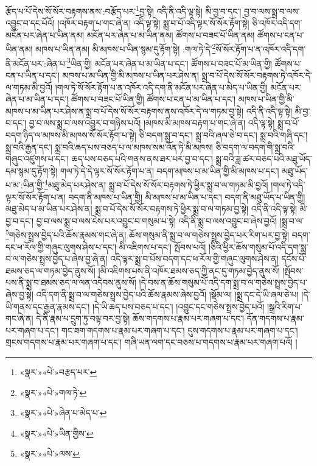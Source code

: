 རྩོད་པ་པོ་དེས་སོ་སོར་བརྟགས་ནས་:བརྩོད་པར་\footnote{«སྣར་»«པེ་»བརྩད་པར་}བྱ་སྟེ། འདི་ནི་འདི་ལྟ་སྟེ། མི་བྱ་བ་དང་། བྱ་བ་ལས་སྨྲ་བ་ལས་འབྱུང་བ་དང་པོའོ། །འཁོར་བརྟག་པ་གང་ཞེ་ན། འདི་ལྟ་སྟེ། སྨྲ་བ་པོ་འདི་ལྟར་སོ་སོར་རྟོག་སྟེ། ཅི་འཁོར་འདི་དག་མངོན་པར་ཞེན་པ་ཡིན་ནམ། མངོན་པར་ཞེན་པ་མ་ཡིན་ནམ། ཚོགས་པ་བཟང་པོ་ཡིན་ནམ། ཚོགས་པ་ངན་པ་ཡིན་ནམ། མཁས་པ་ཡིན་ནམ། མི་མཁས་པ་ཡིན་སྙམ་དུ་རྟོག་སྟེ། :གལ་ཏེ་དེ་\footnote{«སྣར་»«པེ་»གལ་ཏེ་}སོ་སོར་རྟོག་པ་ན་འཁོར་འདི་དག་ནི་མངོན་པར་:ཞེན་པ་\footnote{«སྣར་»«པེ་»ཞེན་པ་མེད་པ་}ཡིན་གྱི། མངོན་པར་ཞེན་པ་མ་ཡིན་པ་དང་། ཚོགས་པ་བཟང་པོ་མ་ཡིན་གྱི། ཚོགས་པ་ངན་པ་ཡིན་པ་དང་། མཁས་པ་མ་ཡིན་གྱི་མི་མཁས་པ་ཡིན་པར་ཤེས་ན། སྨྲ་བ་པོ་དེས་སོ་སོར་བརྟགས་ཏེ་འཁོར་དེ་ལ་གཏམ་མི་བྱའོ། །གལ་ཏེ་སོ་སོར་རྟོག་པ་ན་འཁོར་འདི་དག་ནི་མངོན་པར་ཞེན་པ་མེད་པ་ཡིན་གྱི། མངོན་པར་ཞེན་པ་མ་ཡིན་པ་དང་། ཚོགས་པ་བཟང་པོ་ཡིན་གྱི། ཚོགས་པ་ངན་པ་མ་ཡིན་པ་དང་། མཁས་པ་ཡིན་གྱི་མི་མཁས་པ་མ་ཡིན་པར་ཤེས་ན་སྨྲ་བ་པོ་དེས་སོ་སོར་བརྟགས་ནས་འཁོར་དེ་ལ་གཏམ་བྱ་སྟེ། འདི་ནི་འདི་ལྟ་སྟེ། མི་བྱ་བ་དང་། བྱ་བ་ལས་སྨྲ་བ་ལས་འབྱུར་བ་གཉིས་པའོ། །མཁས་མི་མཁས་བརྟག་པ་གང་ཞེ་ན། འདི་ལྟ་སྟེ། སྨྲ་བ་པོ་བདག་ཉིད་ལ་མཁས་མི་མཁས་སོ་སོར་རྟོག་པ་སྟེ། ཅི་བདག་སྨྲ་བ་དང་། སྨྲ་བའི་ཞལ་ཅེ་བ་དང་། སྨྲ་བའི་གཞི་དང་། སྨྲ་བའི་རྒྱན་དང་། སྨྲ་བའི་ཆད་པས་བཅད་པ་ལ་མཁས་སམ་འོན་ཏེ་མི་མཁས། ཅི་བདག་ལ་བདག་གི་སྨྲ་བའི་གཞུང་འཛུགས་པ་དང་། ཆད་པས་བཅད་པའི་གནས་ནས་ཐར་པར་བྱ་བ་དང་། སྨྲ་བའི་ཟླ་ཚར་བཅད་པའི་མཐུ་ཡོད་དམ་སྙམ་དུ་རྟོག་སྟེ། གལ་ཏེ་དེ་དེ་ལྟར་སོ་སོར་རྟོག་པ་ན། བདག་མཁས་པ་མ་ཡིན་གྱི་མི་མཁས་པ་དང་། མཐུ་ཡོད་པ་མ་:ཡིན་གྱི་\footnote{«སྣར་»«པེ་»ཡིན་གྱིས་}མཐུ་མེད་པར་ཤེས་ན། སྨྲ་བ་པོ་དེས་སོ་སོར་བརྟགས་ཏེ་ཕྱིར་སྨྲ་བ་ལ་གཏམ་མི་བྱའོ། །གལ་ཏེ་འདི་ལྟར་སོ་སོར་རྟོག་པ་ན། བདག་ནི་མཁས་པ་ཡིན་གྱི། མི་མཁས་པ་མ་ཡིན་པ་དང་། བདག་ནི་མཐུ་ཡོད་པ་ཡིན་གྱི། མཐུ་མེད་པ་མ་ཡིན་པར་ཤེས་ན། སྨྲ་བ་པོ་དེས་སོ་སོར་བརྟགས་ཏེ་ཕྱིར་སྨྲ་བ་ལ་གཏམ་བྱ་སྟེ། འདི་ནི་འདི་ལྟ་སྟེ། མི་བྱ་བ་དང་། བྱ་བ་ལས་སྨྲ་བ་ལས་ངེས་པར་འབྱུང་བ་གསུམ་པ་སྟེ། འདི་ནི་སྨྲ་བ་ལས་འབྱུང་བ་ཞེས་བྱའོ། །སྨྲ་བ་ལ་\footnote{«སྣར་»«པེ་»ལས་}གཅེས་སྤྲས་བྱེད་པའི་ཆོས་རྣམས་གང་ཞེ་ན། ཆོས་གསུམ་ནི་སྨྲ་བ་ལ་གཅེས་སྤྲས་བྱེད་པར་རིག་པར་བྱ་སྟེ། བདག་དང་ཕ་རོལ་གྱི་གཞུང་ལུགས་ཤེས་པ་དང་། མི་འཇིགས་པ་དང་། སྤོབས་པའོ། །ཅིའི་ཕྱིར་ཆོས་གསུམ་པོ་འདི་དག་སྨྲ་བ་ལ་གཅེས་སྤྲས་བྱེད་པ་ཞེས་བྱ་ཞེ་ན། འདི་ལྟར་སྨྲ་བ་པོས་བདག་དང་ཕ་རོལ་གྱི་གཞུང་ལུགས་ཤེས་ན། དངོས་པོ་ཐམས་ཅད་ལ་གཏམ་བྱེད་ནུས་སོ། །མི་འཇིགས་པས་ནི་འཁོར་ཐམས་ཅད་ཀྱི་ནང་དུ་གཏམ་བྱེད་ནུས་སོ། །སྤོབས་པས་ནི་སྨྲ་བ་ཐམས་ཅད་ལ་ལན་འདེབས་ནུས་སོ། །དེ་བས་ན་ཆོས་གསུམ་པོ་འདི་དག་སྨྲ་བ་ལ་གཅེས་སྤྲས་བྱེད་པ་ཞེས་བྱ་སྟེ། འདི་དག་ནི་སྨྲ་བ་ལ་གཅེས་སྤྲས་བྱེད་པའི་ཆོས་རྣམས་ཞེས་བྱའོ། །སྡོམ་ལ། །སྨྲ་དང་དེ་ཡི་ཞལ་ཅེ་པ། །དེ་ཡི་གནས་དང་རྒྱན་རྣམས་དང་། །དེ་ཡི་ཆད་པས་བཅད་པ་དང་། །འབྱུང་དང་གཅེས་སྤྲས་བྱེད་པའོ། །སྒྲའི་རིག་པ་གང་ཞེ་ན། དེ་ནི་རྣམ་པ་དྲུག་ཏུ་བལྟ་བར་བྱ་སྟེ། ཆོས་གདགས་པ་རྣམ་པར་གཞག་པ་དང་། དོན་གདགས་པ་རྣམ་པར་གཞག་པ་དང་། གང་ཟག་གདགས་པ་རྣམ་པར་གཞག་པ་དང་། དུས་གདགས་པ་རྣམ་པར་གཞག་པ་དང་། གྲངས་གདགས་པ་རྣམ་པར་གཞག་པ་དང་། གཞི་ཡན་ལག་དང་བཅས་པ་གདགས་པ་རྣམ་པར་གཞག་པའོ། །
